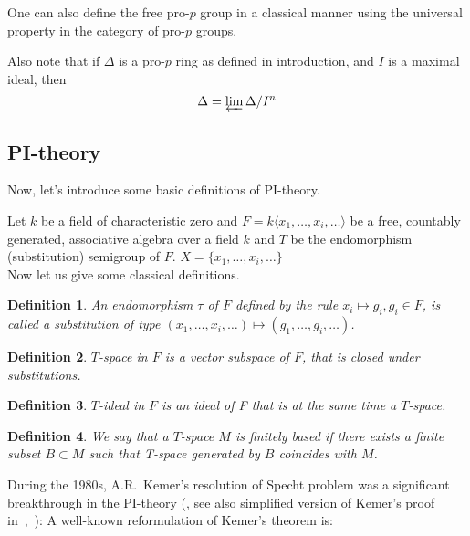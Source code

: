 \documentclass[12pt,a4paper]{article}
\newtheorem{definition}{Definition}[subsection]
\begin{document}
    One can also define the free pro-$p$ group in a classical manner using the universal property in the category of pro-$p$ groups.

    Also note that if $\Delta$ is a pro-$p$ ring as defined in introduction, and $I$ is a maximal ideal, then
    \[ \Delta = \varprojlim \Delta/I^n \]

    \subsection{PI-theory}
    Now, let's introduce some basic definitions of PI-theory.

    Let $k$ be a field of characteristic zero and $F = k\langle x_1,\ldots,x_i,\ldots\rangle$ be a free, countably generated, associative algebra over a field $k$ and $T$ be the endomorphism (substitution) semigroup of $F$. $X = \{ x_1,\ldots,x_i,\ldots\}$\\
    Now let us give some classical definitions.

    \vskip 0.1in\noindent
    \begin{definition}
        An endomorphism $\tau$ of $F$ defined by the rule $x_i \mapsto g_i, g_i \in F$, is called a substitution of type
        $(x_1,\ldots,x_i,\ldots) \mapsto (g_1,\ldots,g_i,\ldots)$.
    \end{definition}
    \vskip 0.1in\noindent

    \vskip 0.1in\noindent
    \begin{definition}
        $T$-space in $F$ is a vector subspace of $F$, that is closed under substitutions.
    \end{definition}
    \vskip 0.1in\noindent

    \vskip 0.1in\noindent
    \begin{definition}
        $T$-ideal in $F$ is an ideal of F that is at the same time a $T$-space.
    \end{definition}
    \vskip 0.1in\noindent

    \vskip 0.1in\noindent
    \begin{definition}
        We say that a $T$-space $M$ is finitely based if there exists a finite subset $B\subset M$ such that T-space generated by $B$ coincides with $M$.
    \end{definition}
    \vskip 0.1in\noindent

    During the 1980s, A.R.\ Kemer's resolution of Specht problem was a significant breakthrough in the PI-theory (\cite{Kemer}, see also simplified version of Kemer's proof in~\cite{Aljadeff-Kanel-Karasik},~\cite{Procesi}):
    A well-known reformulation of Kemer's theorem is:
\end{document}
